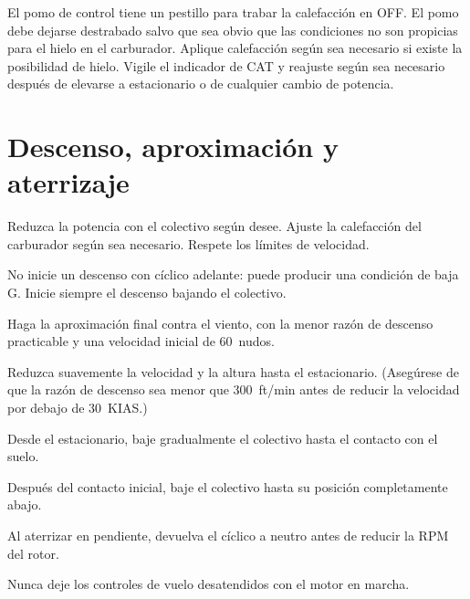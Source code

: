 El pomo de control tiene un pestillo para trabar la calefacción en OFF. El pomo debe dejarse destrabado salvo que sea obvio que las condiciones no son propicias para el hielo en el carburador. Aplique calefacción según sea necesario si existe la posibilidad de hielo. Vigile el indicador de CAT y reajuste según sea necesario después de elevarse a estacionario o de cualquier cambio de potencia.

\section{Descenso, aproximación y aterrizaje}

\begin{pasos}
\item Reduzca la potencia con el colectivo según desee. Ajuste la calefacción del carburador según sea necesario. Respete los límites de velocidad.
\end{pasos}

\begin{precaucion}
No inicie un descenso con cíclico adelante: puede producir una condición de baja G. Inicie siempre el descenso bajando el colectivo.
\end{precaucion}

\begin{pasos}
\setcounter{enumi}{1}
\item Haga la aproximación final contra el viento, con la menor razón de descenso practicable y una velocidad inicial de 60~nudos.
\item Reduzca suavemente la velocidad y la altura hasta el estacionario. (Asegúrese de que la razón de descenso sea menor que 300~ft/min antes de reducir la velocidad por debajo de 30~KIAS.)
\item Desde el estacionario, baje gradualmente el colectivo hasta el contacto con el suelo.
\item Después del contacto inicial, baje el colectivo hasta su posición completamente abajo.
\end{pasos}

\begin{precaucion}
Al aterrizar en pendiente, devuelva el cíclico a neutro antes de reducir la RPM del rotor.
\end{precaucion}

\begin{precaucion}
Nunca deje los controles de vuelo desatendidos con el motor en marcha.
\end{precaucion}

